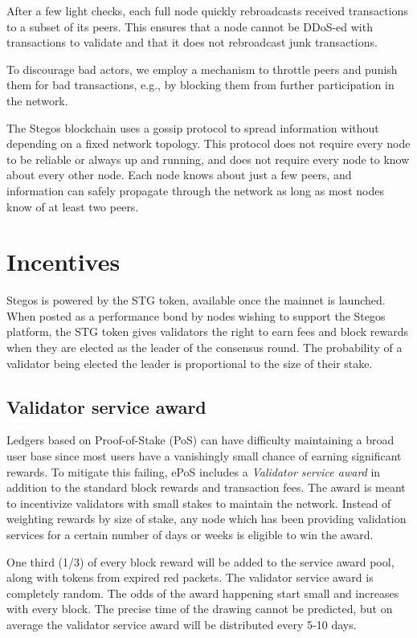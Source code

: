 \documentclass[8pt,fleqn,openany]{book}
\begin{document}
After a few  light checks, each full node quickly rebroadcasts received transactions to a subset of its peers. This ensures that a node cannot be DDoS-ed with transactions to validate and that it does not rebroadcast junk transactions.

To discourage bad actors, we employ a mechanism to throttle peers and punish them for bad transactions, e.g., by blocking them from further participation in the network.

The Stegos blockchain uses a gossip protocol to spread information without depending on a fixed network topology. This protocol does not require every node to be reliable or always up and running, and does not require every node to know about every other node. Each node knows about just a few peers, and information can safely propagate through the network as long as most nodes know of at least two peers.
	
\section{Incentives}
Stegos is powered by the STG token, available once the mainnet is launched. When posted as a performance bond by nodes wishing to support the Stegos platform, the STG token gives validators the right to earn fees and block rewards when they are elected as the leader of the consensus round. The probability of a validator being elected the leader is proportional to the size of their stake.

\subsection{Validator service award}\label{sec:service-award}
Ledgers based on Proof-of-Stake (PoS) can have difficulty maintaining a broad user base since most users have a vanishingly small chance of earning significant rewards. To mitigate this failing, ePoS includes a \textit{Validator service award} in addition to the standard block rewards and transaction fees. The award is meant to incentivize validators with small stakes to maintain the network. Instead of weighting rewards by size of stake, any node which has been providing validation services for a certain number of days or weeks is eligible to win the award.

One third (1/3) of every block reward will be added to the service award pool, along with tokens from expired red packets. The validator service award is completely random. The odds of the award happening start small and increases with every block. The precise time of the drawing cannot be predicted, but on average the validator service award will be distributed every 5-10 days.
\end{document}
